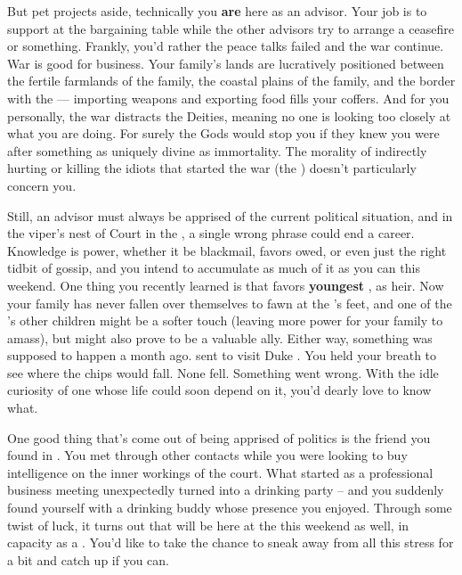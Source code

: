 \documentclass[char]{GL2020}
\begin{document}
But pet projects aside, technically you \textbf{are} here as an advisor. Your job is to support \cEvil{} at the bargaining table while the other advisors try to arrange a ceasefire or something. Frankly, you’d rather the peace talks failed and the war continue. War is good for business. Your family’s lands are lucratively positioned between the fertile farmlands of the \cChupStudent{\formal} family, the coastal plains of the \cWildCard{\formal} family, and the border with the \pTech{} — importing weapons and exporting food fills your coffers. And for you personally, the war distracts the Deities, meaning no one is looking too closely at what you are doing. For surely the Gods would stop you if they knew you were after something as uniquely divine as immortality. The morality of indirectly hurting or killing the idiots that started the war (the \pShip{}) doesn’t particularly concern you.

Still, an advisor must always be apprised of the current political situation, and in the viper's nest of Court in the \pFarm{}, a single wrong phrase could end a career. Knowledge is power, whether it be blackmail, favors owed, or even just the right tidbit of gossip, and you intend to accumulate as much of it as you can this weekend. One thing you recently learned is that \cQueen{\Majesty} \cQueen{} favors \cQueen{\their} \textbf{youngest} \cPrince{\child}, \cPrince{} as \cQueen{\their} heir. Now your family has never fallen over themselves to fawn at the \cQueen{\Majesty}’s feet, and one of the \cQueen{\Majesty}’s other children might be a softer touch (leaving more power for your family to amass), but \cPrince{} might also prove to be a valuable ally. Either way, something was supposed to happen a month ago. \cQueen{\Majesty} \cQueen{} sent \cPrince{} to visit Duke \cChupStudent{\formal}. You held your breath to see where the chips would fall. None fell. Something went wrong. With the idle curiosity of one whose life could soon depend on it, you’d dearly love to know what.

One good thing that’s come out of being apprised of politics is the friend you found in \cHedonist{\full}. You met \cHedonist{} through other contacts while you were looking to buy intelligence on the inner workings of the court. What started as a professional business meeting unexpectedly turned into a drinking party -- and you suddenly found yourself with a drinking buddy whose presence you enjoyed. Through some twist of luck, it turns out that \cHedonist{} will be here at the \pSc{} this weekend as well, in \cHedonist{\their} capacity as a \cHedonist{\cleric}. You’d like to take the chance to sneak away from all this stress for a bit and catch up if you can.
\end{document}
